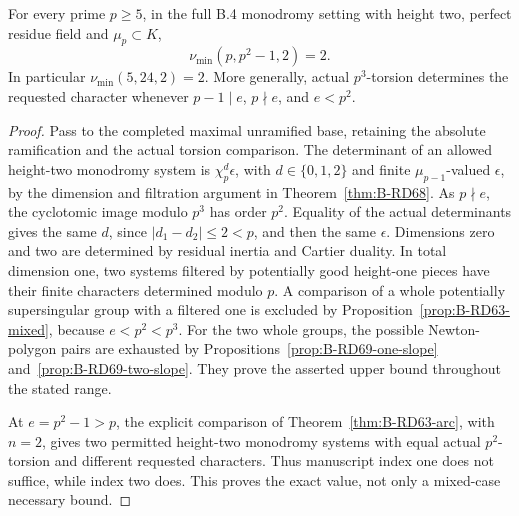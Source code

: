 \begin{theorem}
\label{thm:B-RD69}
For every prime \(p\ge5\), in the full B.4 monodromy setting
with height two, perfect residue field and \(\mu_p\subset K\),
\[
 \boxed{\displaystyle \nu_{\min}(p,p^2-1,2)=2.}
 \tag{B-RD69.13}
\]
In particular \(\nu_{\min}(5,24,2)=2\).
More generally, actual \(p^3\)-torsion determines the requested
character whenever \(p-1\mid e\), \(p\nmid e\), and \(e<p^2\).
\end{theorem}
\begin{proof}
Pass to the completed maximal unramified base, retaining the
absolute ramification and the actual torsion comparison.
The determinant of an allowed height-two monodromy system is
\(\chi_p^d\epsilon\), with \(d\in\{0,1,2\}\) and finite
\(\mu_{p-1}\)-valued \(\epsilon\), by the dimension and
filtration argument in Theorem~\ref{thm:B-RD68}.
As \(p\nmid e\), the cyclotomic image modulo \(p^3\) has
order \(p^2\). Equality of the actual determinants gives the
same \(d\), since \(|d_1-d_2|\le2<p\), and then the same
\(\epsilon\).
Dimensions zero and two are determined by residual inertia
and Cartier duality. In total dimension one, two systems
filtered by potentially good height-one pieces have their
finite characters determined modulo \(p\).
A comparison of a whole potentially supersingular group
with a filtered one is excluded by
Proposition~\ref{prop:B-RD63-mixed}, because \(e<p^2<p^3\).
For the two whole groups, the possible Newton-polygon pairs
are exhausted by Propositions~\ref{prop:B-RD69-one-slope}
and~\ref{prop:B-RD69-two-slope}. They prove the asserted
upper bound throughout the stated range.

At \(e=p^2-1>p\), the explicit comparison of
Theorem~\ref{thm:B-RD63-arc}, with \(n=2\), gives two permitted
height-two monodromy systems with equal actual \(p^2\)-torsion
and different requested characters. Thus manuscript index one
does not suffice, while index two does. This proves the exact
value, not only a mixed-case necessary bound.
\end{proof}

